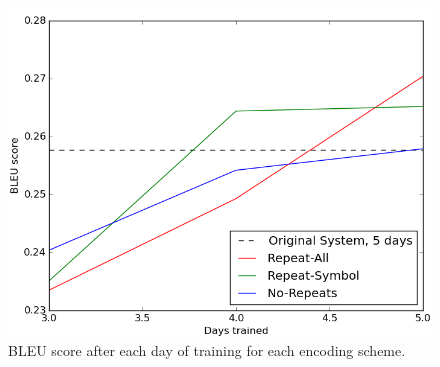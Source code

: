 \begin{figure}
  \centering
  \includegraphics[scale=0.45]{images/graph.png}
  \caption{BLEU score after each day of training for each encoding scheme.}
  \label{fig:graph}
\end{figure}